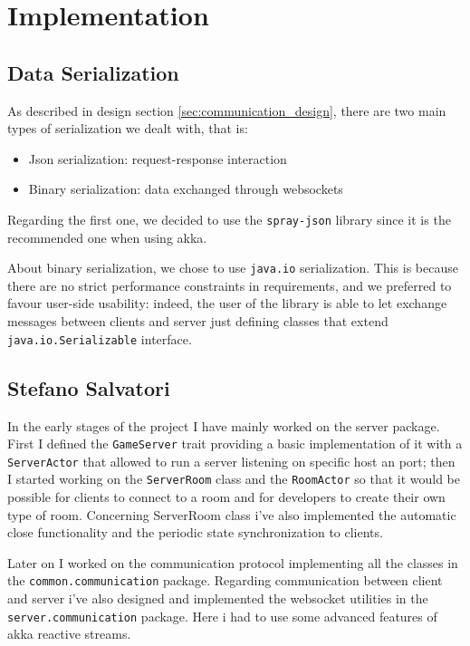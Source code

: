 \chapter{Implementation}
\section{Data Serialization}
As described in design section \ref{sec:communication_design}, there are two main types of serialization we dealt with, that is:
\begin{itemize}
	\item Json serialization: request-response interaction
	\item Binary serialization: data exchanged through websockets
\end{itemize}

Regarding the first one, we decided to use the \texttt{spray-json} library since it is the recommended one when using akka.

About binary serialization, we chose to use \texttt{java.io} serialization. This is because there are no strict performance constraints in requirements, and we preferred to favour user-side usability: indeed, the user of the library is able to let exchange messages between clients and server just defining classes that extend \texttt{java.io.Serializable} interface.



\section{Stefano Salvatori}
In the early stages of the project I have mainly worked on the server package. First I defined the \texttt{GameServer} trait providing a basic implementation of it with a \texttt{ServerActor} that allowed to run a server listening on specific host an port; then I started working on the \texttt{ServerRoom} class and the \texttt{RoomActor} so that it would be possible for clients to connect to a room and for developers to create their own type of room. Concerning ServerRoom class i've also implemented the automatic close functionality and the periodic state synchronization to clients.

Later on I worked on the communication protocol implementing all the classes in the \texttt{common.communication} package. Regarding communication between client and server i've also designed and implemented the websocket utilities in the \texttt{server.communication} package. Here i had to use some advanced features of akka reactive streams. 

